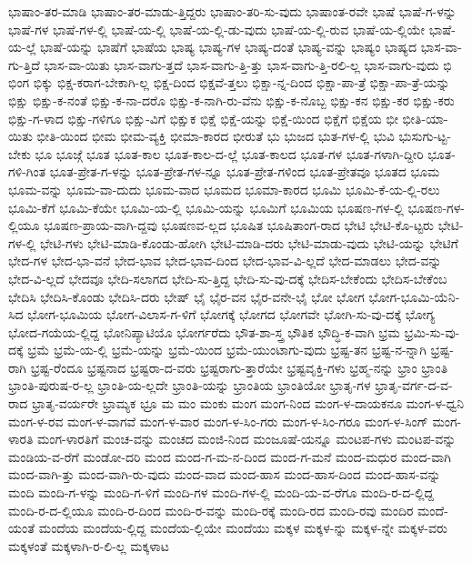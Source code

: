 {ಭಾಷಾಂ-ತರ-ಮಾಡಿ
ಭಾಷಾಂ-ತರ-ಮಾಡು-ತ್ತಿದ್ದರು
ಭಾಷಾಂ-ತರಿ-ಸು-ವುದು
ಭಾಷಾಂತ-ರವೇ
ಭಾಷೆ
ಭಾಷೆ-ಗ-ಳನ್ನು
ಭಾಷೆ-ಗಳ
ಭಾಷೆ-ಗಳ-ಲ್ಲಿ
ಭಾಷೆ-ಯ-ಲ್ಲಿ
ಭಾಷೆ-ಯ-ಲ್ಲಿ-ಡು-ವುದು
ಭಾಷೆ-ಯ-ಲ್ಲಿ-ರುವ
ಭಾಷೆ-ಯ-ಲ್ಲಿಯೇ
ಭಾಷೆ-ಯ-ಲ್ಲೆ
ಭಾಷೆ-ಯನ್ನು
ಭಾಷೆಗೆ
ಭಾಷೆಯ
ಭಾಷ್ಯ
ಭಾಷ್ಯ-ಗಳ
ಭಾಷ್ಯ-ದಂತೆ
ಭಾಷ್ಯ-ವನ್ನು
ಭಾಷ್ಯಂ
ಭಾಷ್ಯದ
ಭಾಸ-ವಾ-ಗು-ತ್ತಿದೆ
ಭಾಸ-ವಾ-ಯಿತು
ಭಾಸ-ವಾಗು-ತ್ತದೆ
ಭಾಸ-ವಾಗು-ತ್ತಿ-ತ್ತು
ಭಾಸ-ವಾಗು-ತ್ತಿ-ರಲಿ-ಲ್ಲ
ಭಾಸ-ವಾಗು-ವುದು
ಭಿ
ಭಿಂಗ
ಭಿಕ್ಕು
ಭಿಕ್ಷ-ಕರಾಗ-ಬೇಕಾಗಿ-ಲ್ಲ
ಭಿಕ್ಷ-ದಿಂದ
ಭಿಕ್ಷವೆ-ತ್ತಲು
ಭಿಕ್ಷಾ-ನ್ನ-ದಿಂದ
ಭಿಕ್ಷಾ-ಪಾ-ತ್ರೆ
ಭಿಕ್ಷಾ-ಪಾ-ತ್ರೆ-ಯನ್ನು
ಭಿಕ್ಷು
ಭಿಕ್ಷು-ಕ-ನಂತೆ
ಭಿಕ್ಷು-ಕ-ನಾ-ದರೊ
ಭಿಕ್ಷು-ಕ-ನಾಗಿ-ರು-ವೆನು
ಭಿಕ್ಷು-ಕ-ನೊಬ್ಬ
ಭಿಕ್ಷು-ಕನ
ಭಿಕ್ಷು-ಕರ
ಭಿಕ್ಷು-ಕರು
ಭಿಕ್ಷು-ಗ-ಳಾದ
ಭಿಕ್ಷು-ಗಳಿಗೂ
ಭಿಕ್ಷು-ವಿಗೆ
ಭಿಕ್ಷುಕ
ಭಿಕ್ಷೆ
ಭಿಕ್ಷೆ-ಯನ್ನು
ಭಿಕ್ಷೆ-ಯಿಂದ
ಭಿಕ್ಷೆಗೆ
ಭಿಕ್ಷೆಯ
ಭೀ
ಭೀತಿ-ಯಾ-ಯಿತು
ಭೀತಿ-ಯಿಂದ
ಭೀಮ
ಭೀಮ-ವ್ಯಕ್ತಿ
ಭೀಮಾ-ಕಾರದ
ಭೀರುತೆ
ಭು
ಭುಜದ
ಭುತ-ಗಳ-ಲ್ಲಿ
ಭುವಿ
ಭುಸುಗು-ಟ್ಟ-ಬೇಕು
ಭೂ
ಭೂಜ್ಗೆ
ಭೂತ
ಭೂತ-ಕಾಲ
ಭೂತ-ಕಾಲ-ದ-ಲ್ಲೆ
ಭೂತ-ಕಾಲದ
ಭೂತ-ಗಳ
ಭೂತ-ಗಳಾಗಿ-ದ್ದೀರಿ
ಭೂತ-ಗಳಿ-ಗಿಂತ
ಭೂತ-ಪ್ರೇತ-ಗ-ಳನ್ನು
ಭೂತ-ಪ್ರೇತ-ಗಳ-ನ್ನೂ
ಭೂತ-ಪ್ರೇತ-ಗಳಿಂದ
ಭೂತ-ಪ್ರೇತವೂ
ಭೂತದ
ಭೂಮ
ಭೂಮ-ವನ್ನು
ಭೂಮ-ವಾ-ದುದು
ಭೂಮ-ವಾದ
ಭೂಮದ
ಭೂಮಾ-ಕಾರದ
ಭೂಮಿ
ಭೂಮಿ-ಕೆ-ಯ-ಲ್ಲಿ-ರಲು
ಭೂಮಿ-ಕೆಗೆ
ಭೂಮಿ-ಕೆಯೇ
ಭೂಮಿ-ಯ-ಲ್ಲಿ
ಭೂಮಿ-ಯನ್ನು
ಭೂಮಿಗೆ
ಭೂಮಿಯ
ಭೂಷಣ-ಗಳ-ಲ್ಲಿ
ಭೂಷಣ-ಗಳ-ಲ್ಲಿಯೂ
ಭೂಷಣ-ಪ್ರಾಯ-ವಾಗಿ-ದ್ದವು
ಭೂಷಣವ-ಲ್ಲದ
ಭೂಷಿತ
ಭೂಷಿತಾಂಗ-ರಾದ
ಭೇಟಿ
ಭೇಟಿ-ಕೊ-ಟ್ಟರು
ಭೇಟಿ-ಗಳ-ಲ್ಲಿ
ಭೇಟಿ-ಗಳು
ಭೇಟಿ-ಮಾಡಿ-ಕೊಂಡು-ಹೋಗಿ
ಭೇಟಿ-ಮಾಡಿ-ದರು
ಭೇಟಿ-ಮಾಡು-ವುದು
ಭೇಟಿ-ಯನ್ನು
ಭೇಟಿಗೆ
ಭೇದ-ಗಳ
ಭೇದ-ಭಾ-ವನೆ
ಭೇದ-ಭಾವ
ಭೇದ-ಭಾವ-ದಿಂದ
ಭೇದ-ಭಾವ-ವಿ-ಲ್ಲದೆ
ಭೇದ-ಮಾಡಲು
ಭೇದ-ವನ್ನು
ಭೇದ-ವಿ-ಲ್ಲದೆ
ಭೇದವೂ
ಭೇದಿ-ಸಲಾಗದ
ಭೇದಿ-ಸು-ತ್ತಿದ್ದ
ಭೇದಿ-ಸು-ವು-ದಕ್ಕೆ
ಭೇದಿಸ-ಬೇಕೆಂದು
ಭೇದಿಸ-ಬೇಕೆಂಬ
ಭೇದಿಸಿ
ಭೇದಿಸಿ-ಕೊಂಡು
ಭೇದಿಸಿ-ದರು
ಭೇಷ್
ಭೈ
ಭೈರ-ವನ
ಭೈರ-ವನೇ-ಭೈ
ಭೋ
ಭೋಗ
ಭೋಗ-ಭೂಮಿ-ಯೆನಿ-ಸಿದ
ಭೋಗ-ಭೂಮಿಯ
ಭೋಗ-ವಿಲಾಸ-ಗ-ಳಿಗೆ
ಭೋಗಕ್ಕೆ
ಭೋಗದ
ಭೋಗವೇ
ಭೋಗಿ-ಸು-ವು-ದಕ್ಕೆ
ಭೋಗ್ಯ
ಭೋದ-ಗಯೆಯ-ಲ್ಲಿದ್ದ
ಭೋನಿಪ್ಯಾಟಿಯೊ
ಭೋರ್ಗರೆದು
ಭೌತ-ಶಾ-ಸ್ತ್ರ
ಭೌತಿಕ
ಭೌದ್ಧಿ-ಕ-ವಾಗಿ
ಭ್ರಮ
ಭ್ರಮಿ-ಸು-ವು-ದಕ್ಕೆ
ಭ್ರಮೆ
ಭ್ರಮೆ-ಯ-ಲ್ಲಿ
ಭ್ರಮೆ-ಯನ್ನು
ಭ್ರಮೆ-ಯಿಂದ
ಭ್ರಮೆ-ಯುಂಟಾಗು-ವುದು
ಭ್ರಷ್ಟ-ತನ
ಭ್ರಷ್ಟ-ನ-ನ್ನಾಗಿ
ಭ್ರಷ್ಟ-ರಾಗಿ
ಭ್ರಷ್ಟ-ರೆಂದೂ
ಭ್ರಷ್ಟನಾದ
ಭ್ರಷ್ಟರಾ-ದ-ವರು
ಭ್ರಷ್ಟರಾಗು-ತ್ತಾರೆಯೇ
ಭ್ರಷ್ಟವೃಕ್ತಿ-ಗಳು
ಭ್ರಹ್ಮ-ನನ್ನು
ಭ್ರಾಂ
ಭ್ರಾಂತಿ
ಭ್ರಾಂತಿ-ಪುರುಷ-ರ-ಲ್ಲ
ಭ್ರಾಂತಿ-ಯ-ಲ್ಲದೇ
ಭ್ರಾಂತಿ-ಯನ್ನು
ಭ್ರಾಂತಿಯ
ಭ್ರಾಂತಿಯೋ
ಭ್ರಾತೃ-ಗಳ
ಭ್ರಾತೃ-ವರ್ಗ-ದ-ವ-ರಾದ
ಭ್ರಾತೃ-ವರ್ಯರೇ
ಭ್ರಾಮ್ಯಕ
ಭ್ರೂ
ಮ
ಮಂ
ಮಂಕು
ಮಂಗ
ಮಂಗ-ನಿಂದ
ಮಂಗ-ಳ-ದಾಯಕನೂ
ಮಂಗ-ಳ-ಧ್ವನಿ
ಮಂಗ-ಳ-ರವ
ಮಂಗ-ಳ-ವಾಗವೆ
ಮಂಗ-ಳ-ವಾರ
ಮಂಗ-ಳ-ಸಿಂ-ಗರು
ಮಂಗ-ಳ-ಸಿಂ-ಗರೂ
ಮಂಗ-ಳ-ಸಿಂಗ್
ಮಂಗ-ಳಾರತಿ
ಮಂಗ-ಳಾರತಿಗೆ
ಮಂಚ-ವನ್ನು
ಮಂಚದ
ಮಂಜಿ-ನಿಂದ
ಮಂಜೂಷೆ-ಯನ್ನೂ
ಮಂಟಪ-ಗಳು
ಮಂಟಪ-ವನ್ನು
ಮಂಡಿಯ-ವ-ರೆಗೆ
ಮಂಡೋ-ದರಿ
ಮಂದ
ಮಂದ-ಗ-ಮ-ನ-ದಿಂದ
ಮಂದ-ಗ-ಮನೆ
ಮಂದ-ಮಧುರ
ಮಂದ-ವಾಗಿ
ಮಂದ-ವಾಗಿ-ತ್ತು
ಮಂದ-ವಾಗಿ-ರು-ವುದು
ಮಂದ-ವಾದ
ಮಂದ-ಹಾಸ
ಮಂದ-ಹಾಸ-ದಿಂದ
ಮಂದ-ಹಾಸ-ವನ್ನು
ಮಂದಿ
ಮಂದಿ-ಗ-ಳನ್ನು
ಮಂದಿ-ಗ-ಳಿಗೆ
ಮಂದಿ-ಗಳ
ಮಂದಿ-ಗಳ-ಲ್ಲಿ
ಮಂದಿ-ಯ-ವ-ರೆಗೂ
ಮಂದಿ-ರ-ದ-ಲ್ಲಿದ್ದ
ಮಂದಿ-ರ-ದ-ಲ್ಲಿಯೂ
ಮಂದಿ-ರ-ದಿಂದ
ಮಂದಿ-ರ-ವನ್ನು
ಮಂದಿ-ರಕ್ಕೆ
ಮಂದಿ-ರದ
ಮಂದಿ-ರವು
ಮಂದಿರ
ಮಂದೆ-ಯಂತೆ
ಮಂದೆಯ
ಮಂದೆಯ-ಲ್ಲಿದ್ದ
ಮಂದೆಯ-ಲ್ಲಿಯೇ
ಮಂದೆಯು
ಮಕ್ಕಳ
ಮಕ್ಕಳ-ನ್ನು
ಮಕ್ಕಳ-ನ್ನೇ
ಮಕ್ಕಳ-ವರು
ಮಕ್ಕಳಂತೆ
ಮಕ್ಕಳಾಗಿ-ರ-ಲಿ-ಲ್ಲ
ಮಕ್ಕಳಾಟ
}
